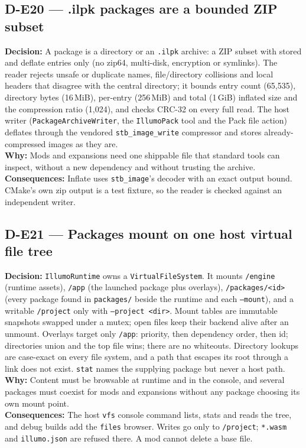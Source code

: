 \subsection*{D-E20 --- .ilpk packages are a bounded ZIP subset}
\begin{decisionbox}[title={D-E20 \quad 2026-09-23}]
\textbf{Decision:} A package is a directory or an \texttt{.ilpk} archive: a
ZIP subset with stored and deflate entries only (no zip64, multi-disk,
encryption or symlinks). The reader rejects unsafe or duplicate names,
file/directory collisions and local headers that disagree with the central
directory; it bounds entry count (65,535), directory bytes (16\,MiB),
per-entry (256\,MiB) and total (1\,GiB) inflated size and the compression
ratio (1,024), and checks CRC-32 on every full read. The host writer
(\texttt{PackageArchiveWriter}, the \texttt{IllumoPack} tool and the Pack file
action) deflates through the vendored \texttt{stb\_image\_write} compressor and
stores already-compressed images as they are.\\
\textbf{Why:} Mods and expansions need one shippable file that standard tools
can inspect, without a new dependency and without trusting the archive.\\
\textbf{Consequences:} Inflate uses \texttt{stb\_image}'s decoder with an
exact output bound. CMake's own zip output is a test fixture, so the reader is
checked against an independent writer.
\end{decisionbox}

\subsection*{D-E21 --- Packages mount on one host virtual file tree}
\begin{decisionbox}[title={D-E21 \quad 2026-09-23}]
\textbf{Decision:} \texttt{IllumoRuntime} owns a \texttt{VirtualFileSystem}.
It mounts \texttt{/engine} (runtime assets), \texttt{/app} (the launched
package plus overlays), \texttt{/packages/<id>} (every package found in
\texttt{packages/} beside the runtime and each \texttt{--mount}), and a
writable \texttt{/project} only with \texttt{--project <dir>}. Mount tables are
immutable snapshots swapped under a mutex; open files keep their backend
alive after an unmount. Overlays target only \texttt{/app}: priority, then
dependency order, then id; directories union and the top file wins; there are
no whiteouts. Directory lookups are case-exact on every file system, and a
path that escapes its root through a link does not exist. \texttt{stat} names
the supplying package but never a host path.\\
\textbf{Why:} Content must be browsable at runtime and in the console, and
several packages must coexist for mods and expansions without any package
choosing its own mount point.\\
\textbf{Consequences:} The host \texttt{vfs} console command lists, stats and
reads the tree, and debug builds add the \texttt{files} browser. Writes go only
to \texttt{/project}; \texttt{*.wasm} and \texttt{illumo.json} are refused
there. A mod cannot delete a base file.
\end{decisionbox}

